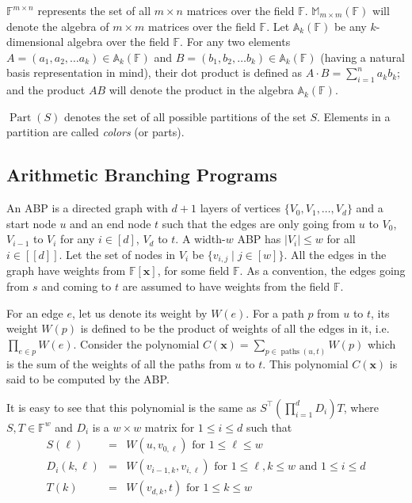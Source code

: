 \documentclass[final,oneeqnum, onethmnum, onefignum]{siamltex1213}
\newcommand{\Mat}{\mathbb M}
\newcommand{\A}{\mathbb A}
\newcommand{\F}{\mathbb F}
\newcommand{\abs}[1]{\lvert #1 \rvert}
\DeclareMathOperator{\Part}{Part}
\DeclareMathOperator{\paths}{paths}
\begin{document}
$\F^{m \times n}$ represents the set of all $m \times n$ matrices over the field $\F$.
$\Mat_{m \times m}(\F)$ will denote the algebra of $m \times m$ matrices over the field $\F$. 
Let $\A_k(\F)$ be any $k$-dimensional algebra over the field $\F$.
For any two elements $A = (a_1, a_2, \dots a_k) \in \A_k(\F)$
and $B = (b_1, b_2, \dots b_k) \in \A_k(\F)$
(having a natural basis representation in mind), 
their dot product
is defined as $A \cdot B = \sum_{i = 1}^n a_k b_k$;
and the product $AB$ will denote the product in the algebra $\A_k(\F)$.

$\Part(S)$ denotes the set of all possible partitions of the set $S$. 
Elements in a partition are called {\em colors} (or parts).

\subsection{Arithmetic Branching Programs}
An ABP is a directed graph with $d+1$ layers of vertices
$\{V_0,V_1, \dots, V_{d}\}$ and a start node $u$ 
and an end node $t$
such that the edges are 
only going from $u$ to $V_0$, $V_{i-1}$ to $V_i$ for any $i \in [d]$,
$V_d$ to $t$. 
A width-$w$ ABP has $\abs{V_i} \leq w$ for all $i \in [[d]]$.
Let the set of nodes in $V_i$ be $\{v_{i,j} \mid j \in [w]\}$.
All the edges in the graph have weights from $\F[\mathbf{x}]$,
for some field $\F$. As a convention, the edges going from $s$
and coming to $t$ are assumed to have weights from the field $\F$.

For an edge $e$, let us denote
its weight by $W(e)$.
For a path $p$ from $u$ to $t$,
its weight $W(p)$ is defined to be the product of weights of all the edges
in it, i.e.\ $\prod_{e \in p} W(e)$. 
Consider the polynomial $C(\mathbf{x}) = \sum_{p \in \paths(u,t)} W(p)$ 
which is the sum of the weights of all the paths from $u$ to $t$.
This polynomial $C(\mathbf{x})$ is said to be computed by the ABP.

It is easy to see that this polynomial is the same as
$S^{\top} (\prod_{i=1}^{d} D_i ) T $,
where $S,T \in \F^w$ 
and $D_i$ is a $w \times w$ matrix for $1 \leq i \leq d$ such that 
\begin{eqnarray*}
S(\ell) &=& W(u,v_{0,\ell}) \text{ for } 1 \leq \ell \leq w\\
D_i(k, \ell) &=& W(v_{i-1,k},v_{i,\ell}) \text{ for } 1 \leq \ell,k \leq w \text{ and } 1 \leq i \leq d\\
T(k) &=& W(v_{d,k},t) \text{ for } 1 \leq k \leq w
\end{eqnarray*}
\end{document}
